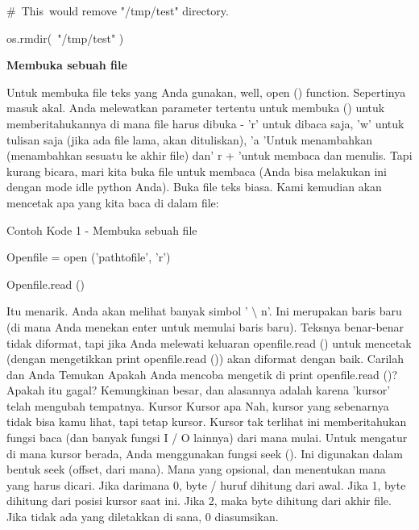 \vspace{12pt}
\noindent 
 $  \#  $~This~would  remove "/tmp/test"  directory. \par
\noindent 
os.rmdir(~"/tmp/test"  ) \par
\vspace{12pt}
\vspace{12pt}
\noindent 
{\fontsize{14pt}{14pt}\selectfont \textbf{Membuka sebuah file} \\} \par
\vspace{12pt}
Untuk membuka file teks yang Anda gunakan, well, open () function. Sepertinya masuk akal. Anda melewatkan parameter tertentu untuk membuka () untuk memberitahukannya di mana file harus dibuka - 'r' untuk dibaca saja, 'w' untuk tulisan saja (jika ada file lama, akan dituliskan), 'a 'Untuk menambahkan (menambahkan sesuatu ke akhir file) dan' r + 'untuk membaca dan menulis. Tapi kurang bicara, mari kita buka file untuk membaca (Anda bisa melakukan ini dengan mode idle python Anda). Buka file teks biasa. Kami kemudian akan mencetak apa yang kita baca di dalam file: \par
\noindent 
Contoh Kode 1 - Membuka sebuah file \par
\vspace{12pt}
\noindent 
Openfile = open ('pathtofile', 'r') \par
\noindent 
Openfile.read () \par
\vspace{12pt}
Itu menarik. Anda akan melihat banyak simbol ' $  \setminus  $ n'. Ini merupakan baris baru (di mana Anda menekan enter untuk memulai baris baru). Teksnya benar-benar tidak diformat, tapi jika Anda melewati keluaran openfile.read () untuk mencetak (dengan mengetikkan print openfile.read ()) akan diformat dengan baik. Carilah dan Anda Temukan Apakah Anda mencoba mengetik di print openfile.read ()? Apakah itu gagal? Kemungkinan besar, dan alasannya adalah karena 'kursor' telah mengubah tempatnya. Kursor Kursor apa Nah, kursor yang sebenarnya tidak bisa kamu lihat, tapi tetap kursor. Kursor tak terlihat ini memberitahukan fungsi baca (dan banyak fungsi I / O lainnya) dari mana mulai. Untuk mengatur di mana kursor berada, Anda menggunakan fungsi seek (). Ini digunakan dalam bentuk seek (offset, dari mana). Mana yang opsional, dan menentukan mana yang harus dicari. Jika darimana 0, byte / huruf dihitung dari awal. Jika 1, byte dihitung dari posisi kursor saat ini. Jika 2, maka byte dihitung dari akhir file. Jika tidak ada yang diletakkan di sana, 0 diasumsikan. \par
